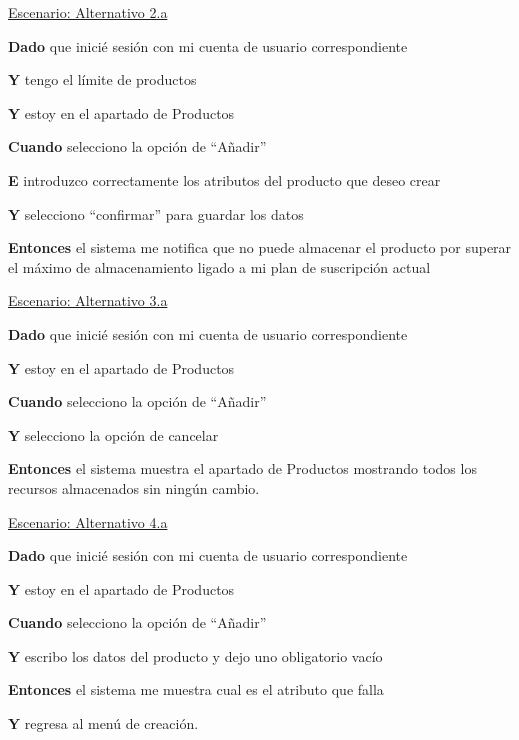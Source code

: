 \underline{Escenario: Alternativo 2.a}\par
\vspace{0.15cm}
\textbf{Dado} que inicié sesión con mi cuenta de usuario correspondiente\par
\textbf{Y} tengo el límite de productos\par
\textbf{Y} estoy en el apartado de Productos\par
\textbf{Cuando} selecciono la opción de \enquote{Añadir}\par
\textbf{E} introduzco correctamente los atributos del producto que deseo crear\par
\textbf{Y} selecciono \enquote{confirmar} para guardar los datos\par
\textbf{Entonces} el sistema me notifica que no puede almacenar el producto por superar el máximo de almacenamiento ligado a mi plan de suscripción actual\par
\vspace{0.20cm}

\underline{Escenario: Alternativo 3.a}\par
\vspace{0.15cm}
\textbf{Dado} que inicié sesión con mi cuenta de usuario correspondiente\par
\textbf{Y} estoy en el apartado de Productos\par
\textbf{Cuando} selecciono la opción de \enquote{Añadir}\par
\textbf{Y} selecciono la opción de cancelar\par
\textbf{Entonces} el sistema muestra el apartado de Productos mostrando todos los recursos almacenados sin ningún cambio.\par
\vspace{0.20cm}

\underline{Escenario: Alternativo 4.a}\par
\vspace{0.15cm}
\textbf{Dado} que inicié sesión con mi cuenta de usuario correspondiente\par
\textbf{Y} estoy en el apartado de Productos\par
\textbf{Cuando} selecciono la opción de \enquote{Añadir}\par
\textbf{Y} escribo los datos del producto y dejo uno obligatorio vacío\par
\textbf{Entonces} el sistema me muestra cual es el atributo que falla\par
\textbf{Y} regresa al menú de creación.\par
\vspace{0.20cm}

